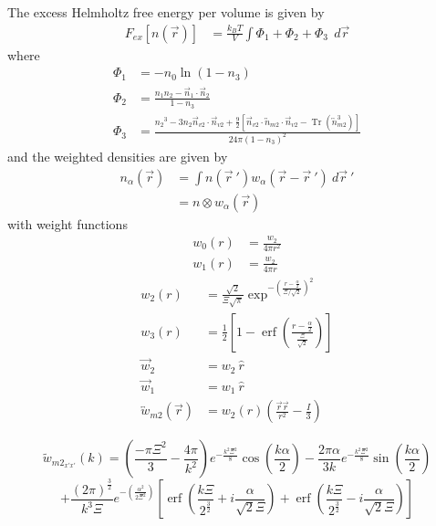 \documentclass[double,12pt]{beavtex}
\begin{document}
The excess Helmholtz free energy per volume is given by
\begin{align}
    F_{{ex}}[n(\vec r)] &= \frac{k_BT}{V}\int\Phi_1
    +\Phi_2+\Phi_3~~d\vec r
\end{align}     
where
\begin{align}
    \Phi_1 &= -n_{0}\ln(1-n_{3}) \\
    \Phi_2 &= \frac{n_1n_2-\vec n_1\cdot\vec n_2}{1-n_3} \\
    \Phi_3 &= \frac{{n_2}^3-3n_2\vec n_{v2}\cdot\vec n_{v2}+\frac{9}{2}
       [\vec n_{v2}\cdot{\overleftrightarrow{n}_{m2}}\cdot{\vec n_{v2}}
       -\operatorname{Tr}({\overleftrightarrow n^3_{m2}})]}{24\pi(1-n_3)^2}  
\end{align}
and the weighted densities are given by 
\begin{align}
    n_\alpha(\vec r) &= \int n(\vec {r}~')w_\alpha(\vec r-\vec {r}~')
                    ~d\vec {r}~'  \label{weighted_densities}  \\
                     &= n\otimes w_\alpha(\vec r)
\end{align}  
with weight functions
\begin{align}\label{eq:weights}
  w_{0}(r) &=\frac{w_{2}}{4\pi{r}^2} \\
  w_{1}(r) &=\frac{w_{2}}{4\pi{r}} 
\end{align}
\begin{align}
  w_2(r) &=\frac{\sqrt{2}}{\Xi\sqrt\pi}\exp^{-\left(\frac{r-\frac{\alpha}
           {2}}{\Xi/\sqrt{2}}\right)^2}  \\
  w_3(r) &=\frac{1}{2}\left[1-\operatorname{erf}\left(\frac{r
          -\frac{\alpha}{2}}{\frac{\Xi}{\sqrt{2}}}\right)\right]  \\
%    
      \vec {w}_2 &= w_2~\hat r \\
      \vec {w}_1 &= w_1~\hat r \\
      \overleftrightarrow{w}_{m2}(\vec{r}) &= w_2(r)\left(\frac{\vec{r}
                                        \vec{r}}{r^2}-\frac{I}{3}\right) 
\end{align}

\begin{equation}
    {\widetilde{w}_{{m2}_{x'x'}}(k)=\left(\frac{-\pi{\Xi}^2}{3}
   -\frac{4\pi}{k^2}\right)e^{-\frac{k^2\Xi^2}{8}}\cos(\frac{k\alpha}{2})
   -\frac{2\pi\alpha}{3k}e^{-\frac{k^2\Xi^2}{8}}\sin(\frac{k\alpha}{2})}
   \nonumber
\end{equation} 
\begin{equation} %
   {+\frac{{(2\pi)}^{\frac{3}{2}}}{k^3\Xi}e^{-\left(\frac{\alpha^2}
   {2\Xi^2}\right)}\left[\operatorname{erf}\left(\frac{k\Xi}{2^\frac{3}{2}}
   +i\frac{\alpha}{\sqrt{2}\Xi}\right)+\operatorname{erf}\left(\frac{k\Xi}
   {2^\frac{3}{2}}-i\frac{\alpha}{\sqrt{2}\Xi}\right)\right]}
\end{equation} 
\end{document}
